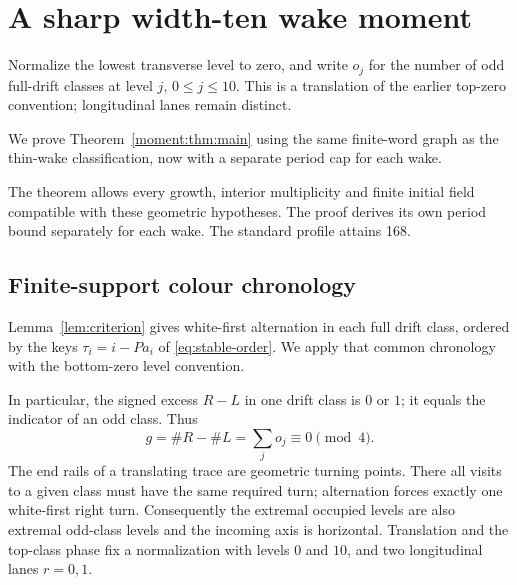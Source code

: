 \section{A sharp width-ten wake moment}\label{sec:moment}
Normalize the lowest transverse level to zero, and write $o_j$ for the number
of odd full-drift classes at level $j$, $0\le j\le10$. This is a translation of
the earlier top-zero convention; longitudinal lanes remain distinct.

We prove Theorem~\ref{moment:thm:main} using the same finite-word graph
as the thin-wake classification, now with a separate period cap for each wake.

The theorem allows every growth, interior multiplicity and finite initial
field compatible with these geometric hypotheses. The proof derives its own
period bound separately for each wake. The standard profile attains 168.

\subsection{Finite-support colour chronology}
Lemma~\ref{lem:criterion} gives white-first alternation in each full drift
class, ordered by the keys $\tau_i=i-Pa_i$ of \eqref{eq:stable-order}.
We apply that common chronology with the bottom-zero level convention.

In particular, the signed excess $R-L$ in one drift class is $0$ or $1$;
it equals the indicator of an odd class. Thus
\begin{equation}\label{moment:eq:growth}
 g=\#R-\#L=\sum_j o_j\equiv0\pmod4.
\end{equation}
The end rails of a translating trace are geometric turning points. There
all visits to a given class must have the same required turn; alternation
forces exactly one white-first right turn. Consequently the extremal occupied
levels are also extremal odd-class levels and the incoming axis is horizontal.
Translation and the top-class phase fix a normalization with levels $0$ and
$10$, and two longitudinal lanes $r=0,1$.

